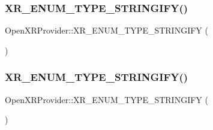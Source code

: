 \subsubsection{\texorpdfstring{XR\_ENUM\_TYPE\_STRINGIFY()}{XR\_ENUM\_TYPE\_STRINGIFY()}\hspace{0.1cm}{\footnotesize\ttfamily [2/3]}}
{\footnotesize\ttfamily Open\+X\+R\+Provider\+::\+X\+R\+\_\+\+E\+N\+U\+M\+\_\+\+T\+Y\+P\+E\+\_\+\+S\+T\+R\+I\+N\+G\+I\+FY (\begin{DoxyParamCaption}\item[{Xr\+Session\+State}]{ }\end{DoxyParamCaption})}

\mbox{\label{namespace_open_x_r_provider_a0605c743043a3b939637dc328150c659}} 
\subsubsection{\texorpdfstring{XR\_ENUM\_TYPE\_STRINGIFY()}{XR\_ENUM\_TYPE\_STRINGIFY()}\hspace{0.1cm}{\footnotesize\ttfamily [3/3]}}
{\footnotesize\ttfamily Open\+X\+R\+Provider\+::\+X\+R\+\_\+\+E\+N\+U\+M\+\_\+\+T\+Y\+P\+E\+\_\+\+S\+T\+R\+I\+N\+G\+I\+FY (\begin{DoxyParamCaption}\item[{Xr\+Reference\+Space\+Type}]{ }\end{DoxyParamCaption})}

